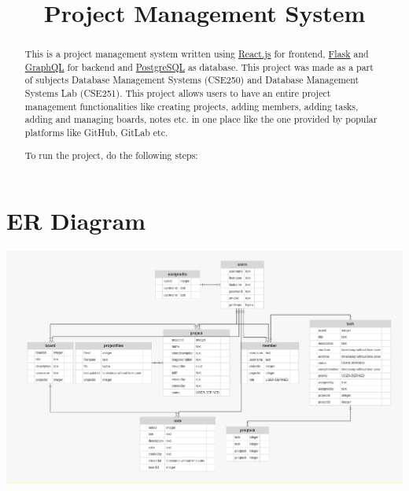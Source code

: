 \documentclass[conference,onecolumn]{IEEEtran}
\begin{document}
\title{Project Management System}

\author{
  \and
  \and
}

\maketitle

\begin{abstract}
  This is a project management system written using \href{https://reactjs.org/}{React.js} for frontend, \href{https://flask.palletsprojects.com/en/1.1.x/}{Flask} and \href{https://graphql.org/}{GraphQL} for backend and \href{https://www.postgresql.org/}{PostgreSQL} as database. This project was made as a part of subjects Database Management Systems (CSE250) and Database Management Systems Lab (CSE251). This project allows users to have an entire project management functionalities like creating projects, adding members, adding tasks, adding and managing boards, notes etc. in one place like the one provided by popular platforms like GitHub, GitLab etc.

  To run the project, do the following steps:
\end{abstract}

\newpage
\section{ER Diagram}
\begin{center}
  \includegraphics[scale=0.3]{ERD.png}
\end{center}
\end{document}
